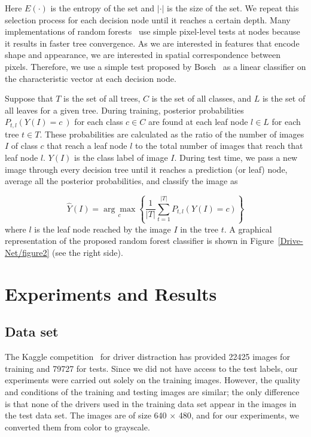 Here $E(\cdot) $ is the entropy of the set and $\left\vert \cdot\right\vert $ is the size of the set. We repeat this selection process for each decision node until it reaches a certain depth. Many implementations of random forests~\cite{lepetit_Keypoint_2006,winn_Object_2006} use simple pixel-level tests at nodes because it results in faster tree convergence. As we are interested in features that encode shape and appearance, we are interested in spatial correspondence between pixels. Therefore, we use a simple test proposed by Bosch~\cite{bosch_Image_2007} {\textemdash} as a linear classifier on the characteristic vector {\textemdash} at each decision node.

Suppose that $T $ is the set of all trees, $C $ is the set of all classes, and $L $ is the set of all leaves for a given tree. During training, posterior probabilities $P_{t,l}\left(Y\left(I\right)=c\:\right) $ for each class $c\in C $ are found at each leaf node $l\in L $ for each tree $t\in T $. These probabilities are calculated as the ratio of the number of images $I $ of class $c $ that reach a leaf node $l $ to the total number of images that reach that leaf node $l $. $Y\left(I\right) $ is the class label of image $I $. During test time, we pass a new image through every decision tree until it reaches a prediction (or leaf) node, average all the posterior probabilities, and classify the image as


\begin{equation}
\label{eq:disp-formula-group-032e1395024b44bca0feeb46474c0adc}
\widehat Y(I) = \underset c {\arg \max} \left\{\frac{1}{\left\vert T\right\vert}\sum_{t=1}^{\left\vert T\right\vert} P_{t,l} (Y(I) = c) \right\}
\end{equation}
where $l $ is the leaf node reached by the image $I $ in the tree $t $. A graphical representation of the proposed random forest classifier is shown in Figure~\ref{Drive-Net/figure2}  (see the right side).

\section{Experiments and Results}
\subsection{Data set}
The Kaggle competition~\cite{montoya_State_2016} for driver distraction has provided 22425 images for training and 79727 for tests. Since we did not have access to the test labels, our experiments were carried out solely on the training images. However, the quality and conditions of the training and testing images are similar; the only difference is that none of the drivers used in the training data set appear in the images in the test data set. The images are of size 640 \ensuremath{\times} 480, and for our experiments, we converted them from color to grayscale.

